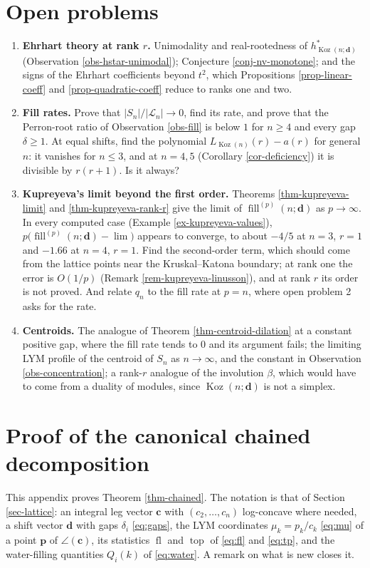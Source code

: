 \documentclass[11pt, a4paper, abstract=yes]{scrartcl}
\theoremstyle{definition}
\theoremstyle{remark}
\theoremstyle{plain}
\newcommand{\vek}[1]{\boldsymbol{#1}}
\theoremstyle{remark}
\theoremstyle{plain}
\newcommand{\Koz}{\operatorname{Koz}}
\newcommand{\tp}{\operatorname{top}}
\newcommand{\rasimp}{\angle}
\newcommand{\fl}{\operatorname{fl}}
\begin{document}
\section{Open problems}
\label{sec-open}
\begin{enumerate}
\item \textbf{Ehrhart theory at rank \(r\).} Unimodality and real-rootedness of \(h^*_{\Koz(n;\vek d)}\)
(Observation \ref{obs-hstar-unimodal}); Conjecture \ref{conj-nv-monotone}; and the signs of the Ehrhart
coefficients beyond \(t^2\), which Propositions \ref{prop-linear-coeff} and \ref{prop-quadratic-coeff}
reduce to ranks one and two.
\item \textbf{Fill rates.} Prove that \(\lvert S_n\rvert/\lvert\mathcal L_n\rvert\to0\), find its rate, and prove
that the Perron-root ratio of Observation \ref{obs-fill} is below \(1\) for \(n\ge4\) and every gap
\(\delta\ge1\). At equal shifts, find the polynomial \(L_{\Koz(n)}(r)-a(r)\) for general \(n\):
it vanishes for \(n\le3\), and at \(n=4,5\) (Corollary \ref{cor-deficiency}) it is divisible by
\(r(r+1)\). Is it always?
\item \textbf{Kupreyeva's limit beyond the first order.} Theorems \ref{thm-kupreyeva-limit} and
\ref{thm-kupreyeva-rank-r} give the limit of \(\operatorname{fill}^{(p)}(n;\vek d)\) as
\(p\to\infty\). In every computed case (Example \ref{ex-kupreyeva-values}),
\(p\bigl(\operatorname{fill}^{(p)}(n;\vek d)-\lim\bigr)\) appears to converge, to about
\(-4/5\) at \(n=3\), \(r=1\) and \(-1.66\) at \(n=4\), \(r=1\). Find the second-order term,
which should come from the lattice points near the Kruskal--Katona boundary; at rank one the
error is \(O(1/p)\) (Remark \ref{rem-kupreyeva-linusson}), and at rank \(r\) its order is not proved.
And relate \(q_n\) to the fill rate at \(p=n\), where open problem 2 asks for the
rate.
\item \textbf{Centroids.} The analogue of Theorem \ref{thm-centroid-dilation} at a constant positive gap, where
the fill rate tends to \(0\) and its argument fails; the limiting LYM profile of the centroid of
\(S_n\) as \(n\to\infty\), and the constant in Observation \ref{obs-concentration}; a rank-\(r\) analogue
of the involution \(\beta\), which would have to come from a duality of modules, since
\(\Koz(n;\vek d)\) is not a simplex.
\end{enumerate}


\appendix
\section{Proof of the canonical chained decomposition}
\label{sec-app-chained}
This appendix proves Theorem \ref{thm-chained}. The notation is that of Section \ref{sec-lattice}: an
integral leg vector \(\vek c\) with \((c_2,\dots,c_n)\) log-concave where needed, a shift vector
\(\vek d\) with gaps \(\delta_i\) \eqref{eq:gaps}, the LYM coordinates \(\mu_k=p_k/c_k\) \eqref{eq:mu} of a point \(\vek p\) of
\(\rasimp(\vek c)\), its statistics \(\fl\) and \(\tp\) of \eqref{eq:fl} and \eqref{eq:tp}, and the
water-filling quantities \(Q_i(k)\) of \eqref{eq:water}. A remark on what is new closes it.
\end{document}
